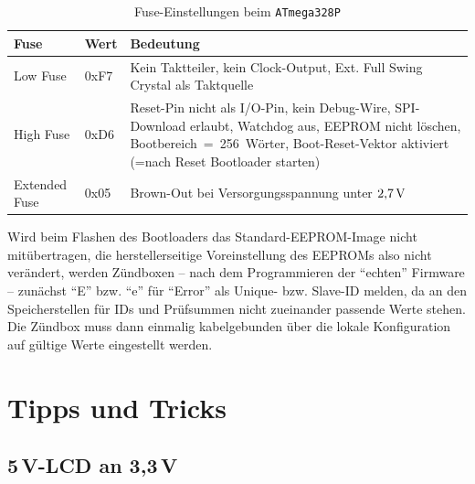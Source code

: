 \documentclass[pdftex, parskip, numbers=noenddot, toc=listof]{scrbook}
\begin{document}
	\begin{table}[h]
		\begin{tabularx}{\textwidth}{llX}
			\textbf{Fuse} & \textbf{Wert}     & \textbf{Bedeutung}                                                                                                                                                                               \\ \hline
			Low Fuse      & 0xF7              & Kein Taktteiler, kein Clock-Output, Ext. Full Swing Crystal als Taktquelle                                                                                                                       \\
			High Fuse     & 0xD6              & Reset-Pin nicht als I/O-Pin, kein Debug-Wire, SPI-Download erlaubt, Watchdog aus, EEPROM nicht löschen, Bootbereich~=~256~Wörter, Boot-Reset-Vektor aktiviert (=nach Reset Bootloader starten) \\
			Extended Fuse & 0x05\footnotemark & Brown-Out bei Versorgungsspannung unter $\unit[2{,}7]{V}$
		\end{tabularx}
		\caption{Fuse-Einstellungen beim \texttt{ATmega328P}}
		\label{tab:fuses}
	\end{table}

	Wird beim Flashen des Bootloaders das Standard-EEPROM-Image nicht mitübertragen, die herstellerseitige Voreinstellung des EEPROMs also nicht verändert, werden Zündboxen -- nach dem Programmieren der \enquote{echten} Firmware -- zunächst \enquote{E} bzw. \enquote{e} für \enquote{Error} als Unique- bzw. Slave-ID melden, da an den Speicherstellen für IDs und Prüfsummen nicht zueinander passende Werte stehen. Die Zündbox muss dann einmalig kabelgebunden über die lokale Konfiguration auf gültige Werte eingestellt werden.


	\chapter{Tipps und Tricks}

	\section[5V-LCD an 3,3V]{5\,V-LCD an 3{,}3\,V}
\end{document}

